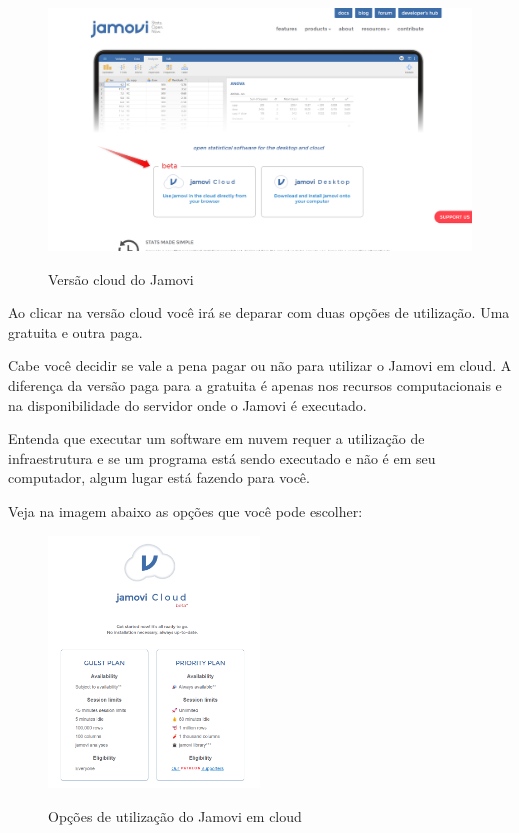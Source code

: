 \begin{figure}[H]
  \centering
  \caption{Versão cloud do Jamovi}
  \includegraphics[width=\textwidth]{imagens/cap_1/jamovi-cloud.png}
  \label{fig:jamovi-cloud}
\end{figure}

Ao clicar na versão cloud você irá se deparar com duas opções de utilização. Uma gratuita e outra paga.

Cabe você decidir se vale a pena pagar ou não para utilizar o Jamovi em cloud. A diferença da versão paga para a gratuita é apenas nos recursos computacionais e na disponibilidade do servidor onde o Jamovi é executado.

Entenda que executar um software em nuvem requer a utilização de infraestrutura e se um programa está sendo executado e não é em seu computador, algum lugar está fazendo para você.

Veja na imagem abaixo as opções que você pode escolher:

\begin{figure}[H]
  \centering
  \caption{Opções de utilização do Jamovi em cloud}
  \includegraphics[width=0.5\textwidth]{imagens/cap_1/opcoes_cloud.png}
  \label{fig:jamovi-cloud}
\end{figure}

